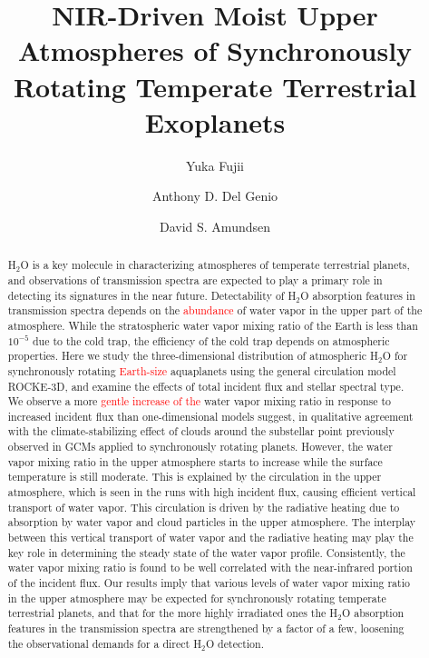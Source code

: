 \documentclass[11pt,numberedappendix,twocolappendix,]{emulateapj}
\def\addYF#1{\textcolor{red}{#1}}
\begin{document}

\title{NIR-Driven Moist Upper Atmospheres of Synchronously Rotating Temperate Terrestrial Exoplanets}

\author{Yuka Fujii}

\author{Anthony D. Del Genio}

\author{David S. Amundsen}


\begin{abstract}
%
H$_2$O is a key molecule in characterizing atmospheres of temperate terrestrial planets, and observations of transmission spectra are expected to play a primary role in detecting its signatures in the near future. 
Detectability of H$_2$O absorption features in transmission spectra depends on the \addYF{abundance} of water vapor in the upper part of the atmosphere. 
While the stratospheric water vapor mixing ratio of the Earth is less than $10^{-5}$ due to the cold trap, the efficiency of the cold trap depends on atmospheric properties. 
Here we study the three-dimensional distribution of atmospheric H$_2$O for synchronously rotating \addYF{Earth-size} aquaplanets using the general circulation model ROCKE-3D, and examine the effects of total incident flux and stellar spectral type.  
We observe a more \addYF{gentle increase of the} water vapor mixing ratio in response to increased incident flux than one-dimensional models suggest, in qualitative agreement with the climate-stabilizing effect of clouds around the substellar point previously observed in GCMs applied to synchronously rotating planets. 
However, the water vapor mixing ratio in the upper atmosphere starts to increase while the surface temperature is still moderate. 
This is explained by the circulation in the upper atmosphere, which is seen in the runs with high incident flux, causing efficient vertical transport of water vapor. 
This circulation is driven by the radiative heating due to absorption by water vapor and cloud particles in the upper atmosphere. 
The interplay between this vertical transport of water vapor and the radiative heating may play the key role in determining the steady state of the water vapor profile. 
Consistently, the water vapor mixing ratio is found to be well correlated with the near-infrared portion of the incident flux. 
Our results imply that various levels of water vapor mixing ratio in the upper atmosphere may be expected for synchronously rotating temperate terrestrial planets, and that for the more highly irradiated ones the H$_2$O absorption features in the transmission spectra are strengthened by a factor of a few, loosening the observational demands for a direct H$_2$O detection. 
%
\end{abstract}
\end{document}
